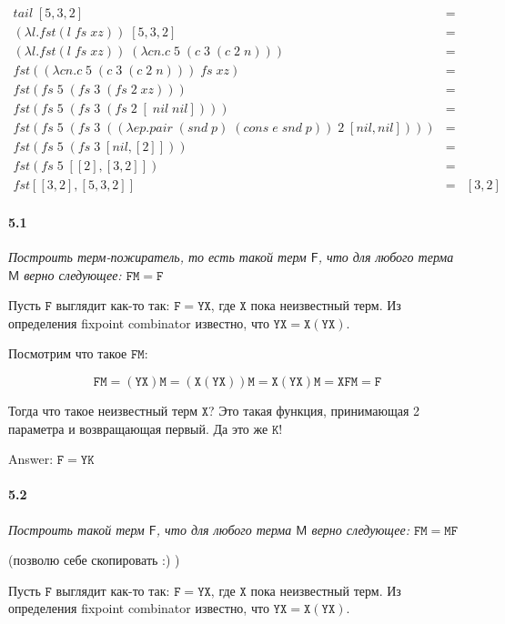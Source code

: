 \documentclass[russian]{article}
\begin{document}
\begin{eqnarray*}
tail\; [5, 3, 2] & =\\
(\lambda l.fst (l\; fs\; xz))\; [5, 3, 2] &=\\
(\lambda l.fst (l\; fs\; xz))\; (\lambda cn.c\;5\;(c\;3\;(c\;2\;n))) &=\\
fst ((\lambda cn.c\;5\;(c\;3\;(c\;2\;n)))\; fs\; xz) &=\\
fst (fs\;5\;(fs\;3\;(fs\;2\;xz))) &=\\
fst (fs\;5\;(fs\;3\;(fs\;2\;[\;nil\;nil]))) &=\\
fst (fs\;5\;(fs\;3\;((\lambda ep.pair\; (snd\; p)\; (cons\; e\; snd\; p))\;2\;[nil, nil]))) &=\\
fst (fs\;5\;(fs\;3\;[nil, [2]])) &=\\
fst (fs\;5\;[[2], [3, 2]]) &=\\
fst [[3, 2], [5, 3, 2]] & = & [3, 2]
\end{eqnarray*}


\paragraph*{5.1} \textit{Построить терм-пожиратель, то есть такой терм $\mathsf{F}$, что для любого терма $\mathsf{M}$ верно следующее: $\mathtt{FM = F}$}

Пусть $\mathtt{F}$ выглядит как-то так: $\mathtt{F = YX}$, где $\mathtt{X}$ пока неизвестный терм. Из определения fixpoint combinator известно, что $\mathtt{YX = X(YX)}$.

Посмотрим что такое $\mathtt{FM}$: 

\[
\mathtt{FM = (YX)M = (X(YX))M = X(YX)M = XFM = F}
\]

Тогда что такое неизвестный терм $\mathtt{X}$? Это такая функция, принимающая 2 параметра и возвращающая первый. Да это же $\mathtt{K}$!

Answer: $\mathtt{F = YK}$

\paragraph*{5.2} \textit{Построить такой терм $\mathsf{F}$, что для любого терма $\mathsf{M}$ верно следующее: $\mathtt{FM = MF}$}

(позволю себе скопировать :) )

Пусть $\mathtt{F}$ выглядит как-то так: $\mathtt{F = YX}$, где $\mathtt{X}$ пока неизвестный терм. Из определения fixpoint combinator известно, что $\mathtt{YX = X(YX)}$.
\end{document}

